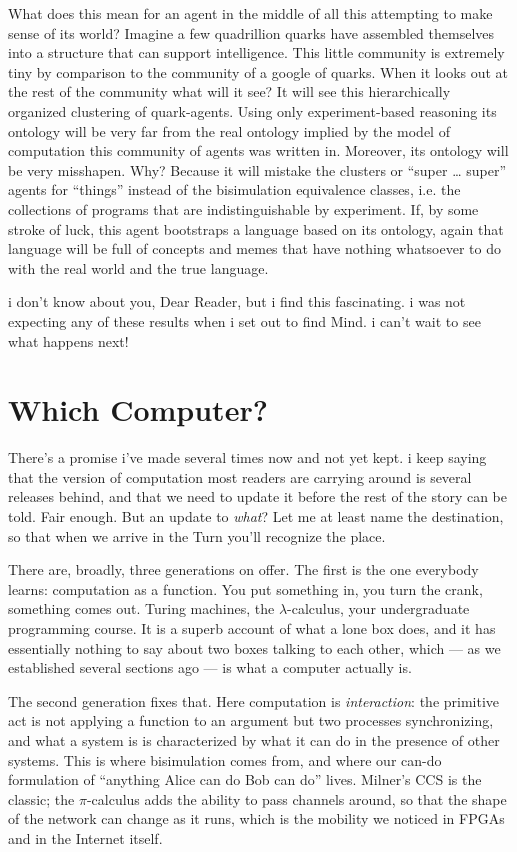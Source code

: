 What does this mean for an agent in the middle of all this attempting to make sense of its world? Imagine a few quadrillion quarks have assembled themselves into a structure that can support intelligence. This little community is extremely tiny by comparison to the community of a google of quarks. When it looks out at the rest of the community what will it see? It will see this hierarchically organized clustering of quark-agents. Using only experiment-based reasoning its ontology will be very far from the real ontology implied by the model of computation this community of agents was written in. Moreover, its ontology will be very misshapen. Why? Because it will mistake the clusters or ``super \ldots{} super'' agents for ``things'' instead of the bisimulation equivalence classes, i.e. the collections of programs that are indistinguishable by experiment. If, by some stroke of luck, this agent bootstraps a language based on its ontology, again that language will be full of concepts and memes that have nothing whatsoever to do with the real world and the true language. 

i don't know about you, Dear Reader, but i find this fascinating. i was not expecting any of these results when i set out to find Mind. i can't wait to see what happens next!

\section{Which Computer?}
\label{sec:pledge-viii}

There's a promise i've made several times now and not yet kept. i keep saying that the version of computation most readers are carrying around is several releases behind, and that we need to update it before the rest of the story can be told. Fair enough. But an update to \emph{what}? Let me at least name the destination, so that when we arrive in the Turn you'll recognize the place.

There are, broadly, three generations on offer. The first is the one everybody learns: computation as a function. You put something in, you turn the crank, something comes out. Turing machines, the $\lambda$-calculus, your undergraduate programming course. It is a superb account of what a lone box does, and it has essentially nothing to say about two boxes talking to each other, which --- as we established several sections ago --- is what a computer actually is.

The second generation fixes that. Here computation is \emph{interaction}: the primitive act is not applying a function to an argument but two processes synchronizing, and what a system is is characterized by what it can do in the presence of other systems. This is where bisimulation comes from, and where our can-do formulation of ``anything Alice can do Bob can do'' lives. Milner's CCS is the classic; the $\pi$-calculus adds the ability to pass channels around, so that the shape of the network can change as it runs, which is the mobility we noticed in FPGAs and in the Internet itself.

